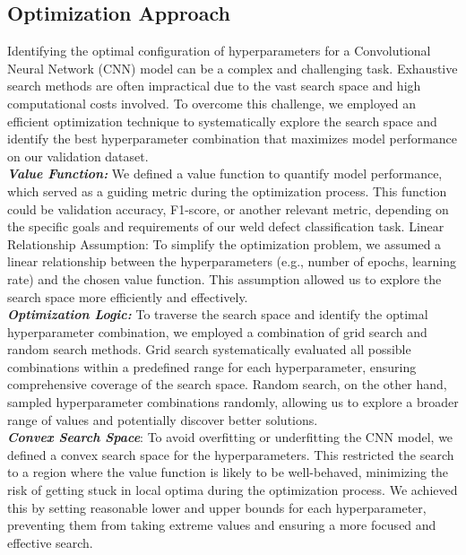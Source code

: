 \documentclass{article_saj}
\begin{document}
\subsection{Optimization Approach}
\indent Identifying the optimal configuration of hyperparameters for a Convolutional Neural Network (CNN) model can be a complex and challenging task. Exhaustive search methods are often impractical due to the vast search space and high computational costs involved. To overcome this challenge, we employed an efficient optimization technique to systematically explore the search space and identify the best hyperparameter combination that maximizes model performance on our validation dataset.\\


    \indent \textbf{\textit{Value Function:}} We defined a value function to quantify model performance, which served as a guiding metric during the optimization process. This function could be validation accuracy, F1-score, or another relevant metric, depending on the specific goals and requirements of our weld defect classification task.
    Linear Relationship Assumption: To simplify the optimization problem, we assumed a linear relationship between the hyperparameters (e.g., number of epochs, learning rate) and the chosen value function. This assumption allowed us to explore the search space more efficiently and effectively.\\
    
    \indent \textbf{\textit{Optimization Logic:}} To traverse the search space and identify the optimal hyperparameter combination, we employed a combination of grid search and random search methods. Grid search systematically evaluated all possible combinations within a predefined range for each hyperparameter, ensuring comprehensive coverage of the search space. Random search, on the other hand, sampled hyperparameter combinations randomly, allowing us to explore a broader range of values and potentially discover better solutions.\\
    
    \indent \textbf{\textit{Convex Search Space}}: To avoid overfitting or underfitting the CNN model, we defined a convex search space for the hyperparameters. This restricted the search to a region where the value function is likely to be well-behaved, minimizing the risk of getting stuck in local optima during the optimization process. We achieved this by setting reasonable lower and upper bounds for each hyperparameter, preventing them from taking extreme values and ensuring a more focused and effective search.\\
\end{document}
